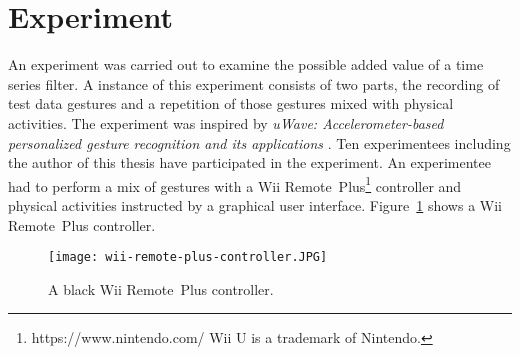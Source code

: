 \section{Experiment} \label{experiment}
An experiment was carried out to examine the possible added value of a time series filter. A instance of this experiment
consists of two parts, the recording of test data gestures and a repetition of those gestures mixed with physical
activities. The experiment was inspired by
\textit{uWave: Accelerometer-based personalized gesture recognition and its applications} \cite{liu2009uwave}. Ten
experimentees including the author of this thesis have participated in the experiment. An experimentee had to perform a
mix of gestures with a Wii
Remote\texttrademark~Plus\footnote{https://www.nintendo.com/ Wii U is a trademark of Nintendo.} controller and physical
activities instructed by a graphical user interface. Figure~\ref{fig:wii-remote} shows a Wii Remote\texttrademark~Plus
controller.
\begin{figure}
    \begin{center}
        \texttt{[image: wii-remote-plus-controller.JPG]}
    \end{center}
    \caption{A black Wii Remote\texttrademark~Plus controller.}
    \label{fig:wii-remote}
\end{figure}




